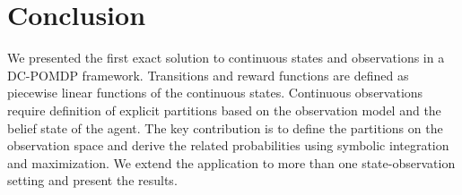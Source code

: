 \documentclass{article} %
\begin{document}
\section{Conclusion} 
%
%
We presented the first exact solution to continuous states and observations in a DC-POMDP framework. Transitions and reward functions are defined as piecewise linear functions of the continuous states. Continuous observations require definition of explicit partitions based on the observation model and the belief state of the agent. The key contribution is to define the partitions on the observation space and derive the related probabilities using symbolic integration and maximization. We extend the application to more than one state-observation setting and present the results.  
 


\end{document}

